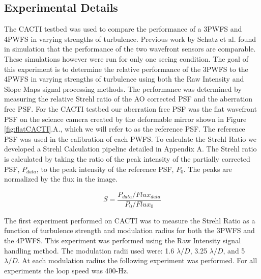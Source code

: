 \documentclass[12pt]{spieman}  %
\begin{document}
\begin{spacing}{2}


\section{Experimental Details}


The CACTI testbed was used to compare the performance of a 3PWFS and 4PWFS in varying strengths of turbulence. Previous work by Schatz et al. found in simulation that the performance of the two wavefront sensors are comparable. These simulations however were run for only one seeing condition. The goal of this experiment is to determine the relative performance of the 3PWFS to the 4PWFS in varying strengths of turbulence using both the Raw Intensity and Slope Maps signal processing methods. The performance was determined by measuring the relative Strehl ratio of the AO corrected PSF and the aberration free PSF. For the CACTI testbed our aberration free PSF was the flat wavefront PSF on the science camera created by the deformable mirror shown in Figure \ref{fig:flatCACTI}.A., which we will refer to as the reference PSF. The reference PSF was used in the calibration of each PWFS. To calculate the Strehl Ratio we developed a Strehl Calculation pipeline detailed in Appendix A. The Strehl ratio is calculated by taking the ratio of the peak intensity of the partially corrected PSF, $P_{data}$,  to the peak intensity of the reference PSF, $P_0$. The peaks are normalized by the flux in the image. 

\begin{equation}
    S=\frac{P_{data}/Flux_{data}}{P_{0}/Flux_{0}}
    \label{Strehl}
\end{equation}

The first experiment performed on CACTI was to measure the Strehl Ratio as a function of turbulence strength and modulation radius for both the 3PWFS and the 4PWFS.  This experiment was performed using the Raw Intensity signal handling method. The modulation radii used were: 1.6 $\lambda/D$, 3.25 $\lambda/D$, and 5 $\lambda/D$. At each modulation radius the following experiment was performed. For all experiments the loop speed was 400-Hz.


\end{spacing}
\end{document}
